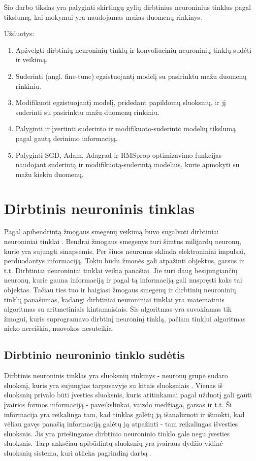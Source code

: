 \documentclass{VUMIFPSkursinis}
\begin{document}
Šio darbo tikslas yra palyginti skirtingų gylių dirbtinius neuroninius tinklus pagal tikslumą, kai mokymui yra naudojamas mažas duomenų rinkinys.

Užduotys:
\begin{enumerate}
\item Apžvelgti dirbtinių neuroninių tinklų ir konvoliucinių neuroninių tinklų sudėtį ir veikimą.
\item Suderinti (angl. fine-tune) egzistuojantį modelį su pasirinktu mažu duomenų rinkiniu.
\item Modifikuoti egzistuojantį modelį, pridedant papildomų sluoksnių, ir jį suderinti su pasirinktu mažu duomenų rinkiniu.
\item Palyginti ir įvertinti suderinto ir modifikuoto-suderinto modelių tikslumą pagal gautą derinimo informaciją.
\item Palyginti SGD, Adam, Adagrad ir RMSprop optimizavimo funkcijas naudojant suderintą ir modifikuotą-suderintą modelius, kurie apmokyti su mažu kiekiu duomenų.
\end{enumerate}

\section{Dirbtinis neuroninis tinklas}
Pagal apibendrintą žmogaus smegenų veikimą buvo sugalvoti dirbtiniai neuroniniai tinklai \cite{Goodfellow-et-al-2016}. Bendrai žmogaus smegenys turi šimtus
milijardų neuronų, kurie yra sujungti sinapsėmis. Per šiuos neuronus sklinda elektroniniai impulsai, perduodantys informaciją. Tokiu būdu žmonės gali 
atpažinti objektus, garsus ir t.t. Dirbtiniai neuroniniai tinklai veikia panašiai. Jie turi daug besijungiančių neuronų, kurie gauna informaciją ir 
pagal tą informaciją gali nuspręsti koks tai objektas. Tačiau ties tuo ir baigiasi žmogaus smegenų ir dirbtinių neuroninių tinklų panašumas, 
kadangi dirbtiniai neuroniniai tinklai yra matematinis algoritmas su aritmetiniais kintamaisiais. Šis algoritmas yra suvokiamas 
tik žmogui, kuris suprogramavo dirbtinį neuroninį tinklą, pačiam tinklui algoritmas nieko nereiškia, nuovokos nesuteikia.

\subsection{Dirbtinio neuroninio tinklo sudėtis}
Dirbtinis neuroninis tinklas yra sluoksnių rinkinys - neuronų grupė sudaro sluoksnį, kuris yra sujungtas tarpusavyje su kitais sluoksniais \cite{1193152}. Vienas iš
sluoksnių privalo būti įvesties sluoksnis, kuris atitinkamai pagal užduotį gali gauti įvairios formos informaciją - paveiksliukai, vaizdo
medžiaga, garsas ir t.t. Ši informacija yra reikalinga tam, kad tinklas galėtų ją išanalizuoti ir išmokti, kad vėliau gavęs panašią
informaciją galėtų ją atpažinti - tam reikalingas išvesties sluoksnis. Jis yra priešingame dirbtinio neuroninio tinklo gale negu įvesties sluoksnis.
Tarp anksčiau apibūdintų sluoksnių yra įvairaus dydžio vidinė sluoksnių sistema, kuri atlieka pagrindinį darbą \cite{Woodford-2018}.
\end{document}
